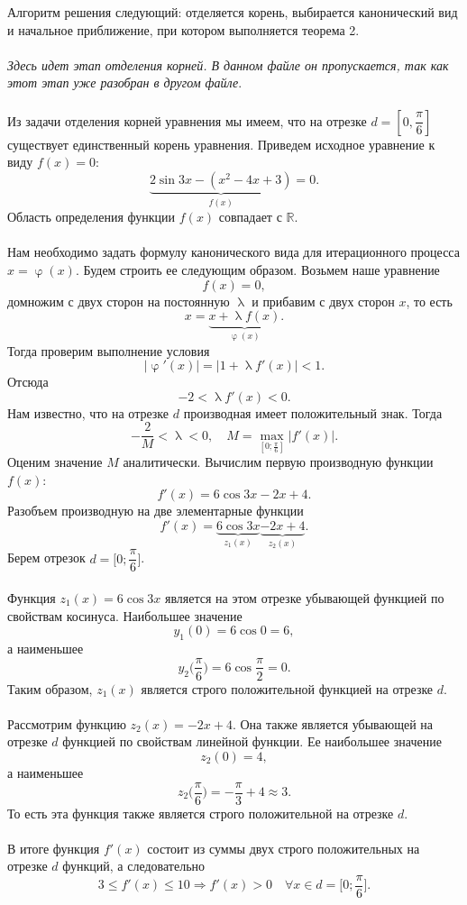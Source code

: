 \documentclass[a4paper, 12pt]{article}
\newcommand{\Rm}{\mathbb{R}}
\renewcommand{\leq}{\leqslant}
\renewcommand{\varphi}{\upvarphi}
\renewcommand{\lambda}{\uplambda}
\begin{document}
	Алгоритм решения следующий: отделяется корень, выбирается канонический вид и начальное приближение, при котором выполняется теорема 2.\\\\
	\textit{Здесь идет этап отделения корней. В данном файле он пропускается, так как этот этап уже разобран в другом файле}.\\\\
	Из задачи отделения корней уравнения мы имеем, что на отрезке $d = \left[0, \dfrac\pi6\right]$ существует единственный корень уравнения. Приведем исходное уравнение к виду $f(x) = 0$: $$\underbrace{2\sin 3x - (x^2 - 4x+3)}_{f(x)} = 0.$$
	Область определения функции $f(x)$ совпадает с $\Rm$.\\\\
	Нам необходимо задать формулу канонического вида для итерационного процесса $x = \varphi(x)$. Будем строить ее следующим образом. Возьмем наше уравнение $$f(x) = 0,$$ домножим с двух сторон на постоянную $\lambda$ и прибавим с двух сторон $x$, то есть $$x = \underbrace{x + \lambda f(x)}_{\varphi(x)}.$$ Тогда проверим выполнение условия $$|\varphi'(x)| = |1 + \lambda f'(x)| < 1.$$
	Отсюда $$-2< \lambda f'(x)< 0.$$ Нам известно, что на отрезке $d$ производная имеет положительный знак. Тогда $$-\dfrac{2}{M} < \lambda < 0,\quad M = \max_{[0; \frac\pi6]}|f'(x)|.$$
	Оценим значение $M$ аналитически. Вычислим первую производную функции $f(x)$:
	$$f'(x) = 6\cos 3x - 2x + 4.$$
	Разобъем производную на две элементарные функции
	$$f'(x) = \underbrace{6\cos3x}_{z_1(x)} \underbrace{- 2x + 4}_{z_2(x)}.$$
	Берем отрезок $d = \Big[0; \dfrac\pi6\Big]$. 
	\\\\
	Функция $z_1(x) = 6\cos3x$ является на этом отрезке убывающей функцией по свойствам косинуса. Наибольшее значение $$y_1(0)= 6\cos0 = 6,$$ а наименьшее $$y_2\Big(\dfrac\pi6\Big) = 6\cos\dfrac\pi2 = 0.$$
	Таким образом, $z_1(x)$ является строго положительной функцией на отрезке $d$. 
	\\\\
	Рассмотрим функцию $z_2(x) = -2x + 4$. Она также является убывающей на отрезке $d$ функцией по свойствам линейной функции. Ее наибольшее значение $$z_2(0) = 4,$$ а наименьшее $$z_2\Big(\dfrac\pi6\Big) = -\dfrac\pi3 + 4\approx 3.$$
	То есть эта функция также является строго положительной на отрезке $d$. 
	\\\\
	В итоге функция $f'(x)$ состоит из суммы двух строго положительных на отрезке $d$ функций, а следовательно $$3 \leq f'(x) \leq 10 \Rightarrow f'(x) > 0\quad \forall x \in d=\Big[0; \dfrac\pi6\Big].$$
\end{document}
